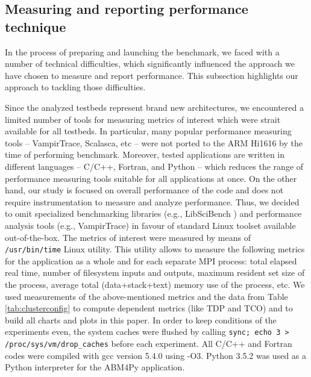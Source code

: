 \subsection{Measuring and reporting performance technique}
\label{sec:measuring}

In the process of preparing and launching the benchmark,
we faced with a number of technical difficulties,
which significantly influenced the approach
we have chosen to measure and report performance.
This subsection highlights our approach to tackling those difficulties.

Since the analyzed testbeds represent brand new architectures,
we encountered a limited number of tools for measuring metrics of interest
which were strait available for all testbeds.
In particular,
many popular performance measuring tools -- VampirTrace, Scalasca, etc --
were not ported to the ARM Hi1616 by the time of performing benchmark.
Moreover, tested applications are written in different languages -- C/C++, Fortran, and Python --
which reduces the range of performance measuring tools suitable for all applications at once.
On the other hand, our study is focused on overall performance of the code
and does not require instrumentation to measure and analyze performance.
Thus, we decided to omit specialized benchmarking libraries (e.g., \textsf{LibSciBench} \cite{2015:Hoefler})
and performance analysis tools (e.g., VampirTrace)
in favour of standard Linux toolset available out-of-the-box.
The metrics of interest were measured by means of \texttt{/usr/bin/time} Linux utility.
This utility allows to measure the following metrics for the application as a whole and for each separate MPI process:
total elapsed real time, number of filesystem inputs and outputs,
maximum resident set size of the process,
average total (data+stack+text) memory use of the process,
etc.
We used measurements of the above-mentioned metrics and the data from Table\,\ref{tab:clusterconfig}
to compute dependent metrics (like TDP and TCO) and to build all charts and plots in this paper.
In order to keep conditions of the experiments even, %
the system caches were flushed by calling
\texttt{sync; echo 3 > /proc/sys/vm/drop\_caches} before each experiment.
All C/C++ and Fortran codes were compiled with gcc version 5.4.0 using -O3.
Python 3.5.2 was used as a Python interpreter for the ABM4Py application.



